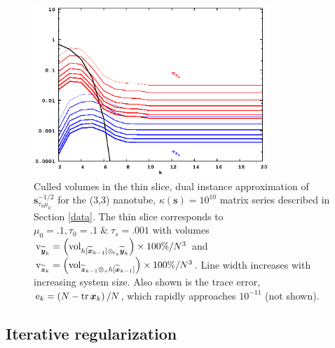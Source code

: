 \documentclass[letterpaper,twocolumn,amsmath,amsfont,amssymb,english,aps,jcp,preprintnumbers,groupaddress,nofootinbib,tightenlines,floatfix]{revtex4}
\newcommand{\mat}[1]{\boldsymbol{#1}}
\newcommand{\ot}{  {\scriptstyle \otimes}_{ \tau } }
\newcommand{\ots}{ {\scriptstyle \otimes}_{ \! \tau_s } }
\theoremstyle{plain}
\theoremstyle{remark}
\theoremstyle{plain}
\begin{document}
\begin{figure}[h]
 \includegraphics[width=3.5in]{fig_33_tube_cond_10_regularized/33_tube_k10_regularized_dual.eps}
\caption{
Culled volumes in the thin slice, dual instance approximation of $\mat{s}^{-1/2}_{\tau_0 \mu_0}$
for the (3,3) nanotube, $\kappa(\mat{s})=10^{10}$ matrix series 
described in Section \ref{data}. The thin slice corresponds to $\mu_0=.1, \tau_0=.1 \;  \&  \; \tau_s=.001$ 
with volumes 
${\rm v}_{\widetilde{\mat{y}}_k}= \left( {\rm vol}_{  h[\widetilde{\mat{x}}_{k-1}] \ots \widetilde{\mat{y}}_k }  \right) \times 100\% /N^3$ and  
${\rm v}_{\widetilde{\mat{z}}_k}= \left( {\rm vol}_{\widetilde{\mat{z}}_{k-1} \ot  h[\widetilde{\mat{x}}_{k-1}]} \right) \times 100\% /N^3$.
Line width increases with increasing system size. 
Also shown is the trace error, ${\rm e}_{k} = \left( N-{\rm tr}\,\mat{x}_k \right)/N$, which rapidly approaches $10^{-11}$ (not shown). 
}\label{regularized_dual}
\end{figure} 


\subsection{Iterative regularization}
\end{document}
